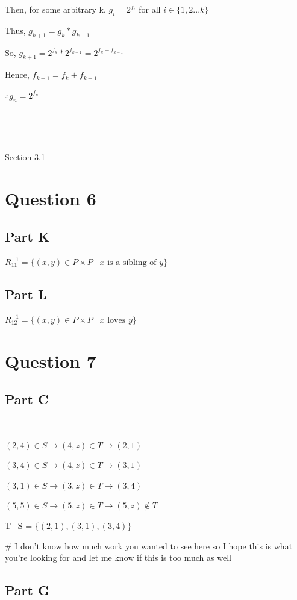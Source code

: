 \documentclass{article}
\begin{document}
Then, for some arbitrary k, $g_i=2^{f_i}$ for all $i \in \{1,2...k\}$

Thus, $g_{k+1}=g_k*g_{k-1}$

So, $g_{k+1}=2^{f_k}*2^{f_{k-1}}=2^{f_k+f_{k-1}}$

Hence, $f_{k+1}=f_k+f_{k-1}$

$\therefore g_n=2^{f_n}$

\

\

{\huge{Section 3.1}}
\section*{Question 6}
\subsection*{Part K}

$R_{11}^{-1} = \{(x, y) \in P \times P \mid x \text{ is a sibling of } y\}$

\subsection*{Part L}

$R_{12}^{-1} = \{(x, y) \in P \times P \mid x \text{ loves } y\}$

\section*{Question 7}
\subsection*{Part C}

\

$(2,4) \in S \rightarrow (4,z) \in T \rightarrow (2,1)$

$(3,4) \in S \rightarrow (4,z) \in T \rightarrow (3,1) $

$(3,1) \in S \rightarrow (3,z) \in T \rightarrow (3,4) $

$(5,5) \in S \rightarrow (5,z) \in T \rightarrow (5,z) \notin T$

T \textopenbullet \  S = $\{(2,1),(3,1),(3,4)\}$


\# I don't know how much work you wanted to see here so I hope this is what you're looking for and let me know if this is too much as well

\subsection*{Part G}
\end{document}
